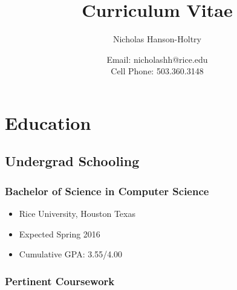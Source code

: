 \documentclass[12pt]{article}
\begin{document}
\title{Curriculum Vitae}
\author{\Large{Nicholas Hanson-Holtry}}
\date{Email: nicholashh@rice.edu
\\ Cell Phone: 503.360.3148}
\maketitle





\section{Education}

\subsection{Undergrad Schooling}

\subsubsection{Bachelor of Science in Computer Science}

\begin{itemize}
    \item{Rice University, Houston Texas}
    \item{Expected Spring 2016}
    \item{Cumulative GPA: 3.55/4.00}
\end{itemize}





\subsubsection{Pertinent Coursework}
\end{document}
